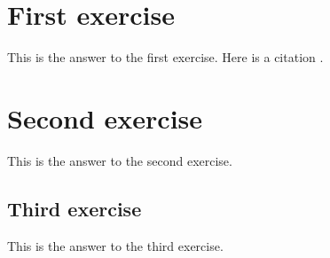 \section*{First exercise}
This is the answer to the first exercise. Here is a citation \cite{google}.

\section*{Second exercise}
This is the answer to the second exercise.

\subsection*{Third exercise}
This is the answer to the third exercise.
